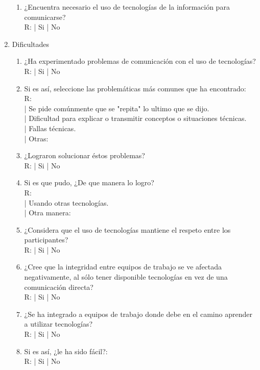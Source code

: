 \begin{enumerate}
\begin{enumerate}
        \item ¿Encuentra necesario el uso de tecnologías de la información
        para comunicarse?\\
        R: | Si | No

    \end{enumerate}
    \item Dificultades
    \begin{enumerate}
        \item ¿Ha experimentado problemas de comunicación con el uso de tecnologías?\\
        R: | Si | No
        \item Si es así, seleccione las problemáticas más comunes que ha
        encontrado:\\
        R:\\
	    | Se pide comúnmente que se "repita" lo ultimo que se dijo.\\
	    | Dificultad para explicar o transmitir conceptos o situaciones técnicas.\\
        | Fallas técnicas.\\
        | Otras: 
        \item ¿Lograron solucionar éstos problemas?\\
        R: | Si | No
        \item Si es que pudo, ¿De que manera lo logro?\\
        R:\\
        | Usando otras tecnologías.\\
        | Otra manera:
        \item ¿Considera que el uso de tecnologías mantiene el respeto entre los participantes?\\
        R: | Si | No
        \item ¿Cree que la integridad entre equipos de trabajo se ve afectada negativamente, al sólo tener disponible tecnologías en vez de una comunicación directa?\\
        R: | Si | No
        \item ¿Se ha integrado a equipos de trabajo donde debe en el camino aprender a utilizar tecnologías?\\
        R: | Si | No
        \item Si es así, ¿le ha sido fácil?:\\
        R: | Si | No\\
	\end{enumerate}
\end{enumerate}


